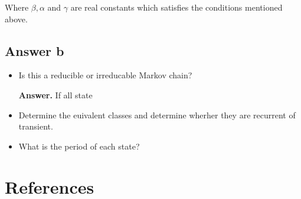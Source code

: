 \documentclass{article}
\theoremstyle{remark}
\newcommand{\newpara}
  {
  \vskip 0.4cm
  }
\begin{document}
Where $\beta , \alpha$ and $  \gamma $ are real constants which satisfies the conditions mentioned above.

\subsection{Answer b}%
\label{sub:answer_b}

\begin{itemize}
  \item Is this a reducible or irreducable Markov chain? 
    \newpara
    \textbf{Answer.}  
    If all state

  \item Determine the euivalent classes and determine wherher they are recurrent of transient.
  \item What is the period of each state? 
\end{itemize}





\newpage
\section{References}%
\label{sec:references}



\end{document}
